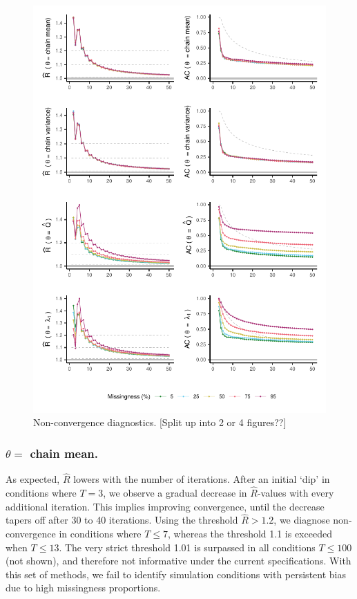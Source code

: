 \documentclass[Royal,times,sageh]{sagej}
\begin{document}
\begin{figure}

{\centering \includegraphics{2.Manuscript_files/figure-latex/rhats-acs-1} 

}

\caption{Non-convergence diagnostics. [Split up into 2 or 4 figures??]}\label{fig:rhats-acs}
\end{figure}

\hypertarget{theta-chain-mean.}{%
\subsubsection{\texorpdfstring{\(\theta=\) chain mean.}{\textbackslash theta= chain mean.}}\label{theta-chain-mean.}}

As expected, \(\widehat{R}\) lowers with the number of iterations. After an initial `dip' in conditions where \(T=3\), we observe a gradual decrease in \(\widehat{R}\)-values with every additional iteration. This implies improving convergence, until the decrease tapers off after 30 to 40 iterations. Using the threshold \(\widehat{R}>1.2\), we diagnose non-convergence in conditions where \(T\leq7\), whereas the threshold 1.1 is exceeded when \(T\leq13\). The very strict threshold 1.01 is surpassed in all conditions \(T\leq100\) (not shown), and therefore not informative under the current specifications. With this set of methods, we fail to identify simulation conditions with persistent bias due to high missingness proportions.
\end{document}
